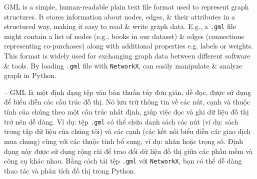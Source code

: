 \documentclass{article}
\begin{document}
\begin{itemize}
\begin{itemize}
\begin{itemize}
           GML is a simple, human-readable plain text file format used to represent graph structures. It stores information about nodes, edges, \& their attributes in a structured way, making it easy to read \& write graph data. E.g., a {\tt.gml} file might contain a list of nodes (e.g., books in our dataset) \& edges (connections representing co-purchases) along with additional properties e.g. labels or weights. This format is widely used for exchanging graph data between different software \& tools. By loading {\tt.gml} file with {\tt NetworkX}, can easily manipulate \& analyze graph in Python.

           -- GML là một định dạng tệp văn bản thuần túy đơn giản, dễ đọc, được sử dụng để biểu diễn các cấu trúc đồ thị. Nó lưu trữ thông tin về các nút, cạnh và thuộc tính của chúng theo một cấu trúc nhất định, giúp việc đọc và ghi dữ liệu đồ thị trở nên dễ dàng. Ví dụ: tệp {\tt.gml} có thể chứa danh sách các nút (ví dụ: sách trong tập dữ liệu của chúng tôi) và các cạnh (các kết nối biểu diễn các giao dịch mua chung) cùng với các thuộc tính bổ sung, ví dụ: nhãn hoặc trọng số. Định dạng này được sử dụng rộng rãi để trao đổi dữ liệu đồ thị giữa các phần mềm và công cụ khác nhau. Bằng cách tải tệp {\tt.gml} với {\tt NetworkX}, bạn có thể dễ dàng thao tác và phân tích đồ thị trong Python.


\end{itemize}
\end{itemize}
\end{itemize}
\end{document}
